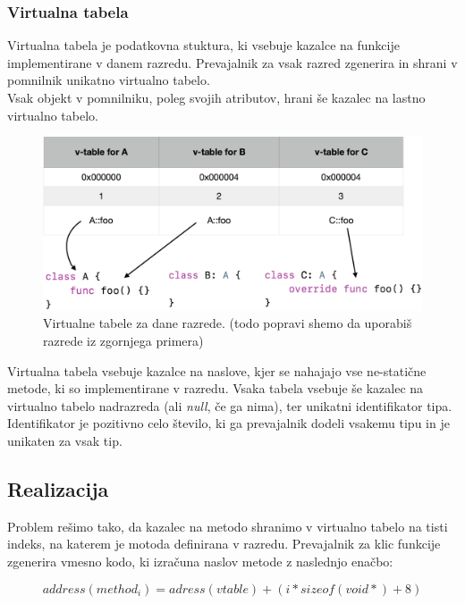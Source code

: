 \documentclass[a4paper, 12pt]{book}
\begin{document}
\subsubsection{Virtualna tabela}

Virtualna tabela je podatkovna stuktura, ki vsebuje kazalce na funkcije implementirane v danem razredu. Prevajalnik za vsak razred zgenerira in shrani v pomnilnik unikatno virtualno tabelo. \\
\indent Vsak objekt v pomnilniku, poleg svojih atributov, hrani še kazalec na lastno virtualno tabelo.

\begin{figure}[h]
	\begin{center}
		\includegraphics[width=1\textwidth]{resources/v-tables.png}
	\end{center}
	\caption{Virtualne tabele za dane razrede. (todo popravi shemo da uporabiš razrede iz zgornjega primera)}
	\label{vtables}
\end{figure}

Virtualna tabela vsebuje kazalce na naslove, kjer se nahajajo vse ne-statične metode, ki so implementirane v razredu. Vsaka tabela vsebuje še kazalec na virtualno tabelo nadrazreda (ali \textit{null}, če ga nima), ter unikatni identifikator tipa. Identifikator je pozitivno celo število, ki ga prevajalnik dodeli vsakemu tipu in je unikaten za vsak tip. \\

\subsection{Realizacija}

Problem rešimo tako, da kazalec na metodo shranimo v virtualno tabelo na tisti indeks, na katerem je motoda definirana v razredu. Prevajalnik za klic funkcije zgenerira vmesno kodo, ki izračuna naslov metode z naslednjo enačbo:

\[ address(method_i) = adress(vtable) + (i * sizeof(void*) + 8) \]
\end{document}
